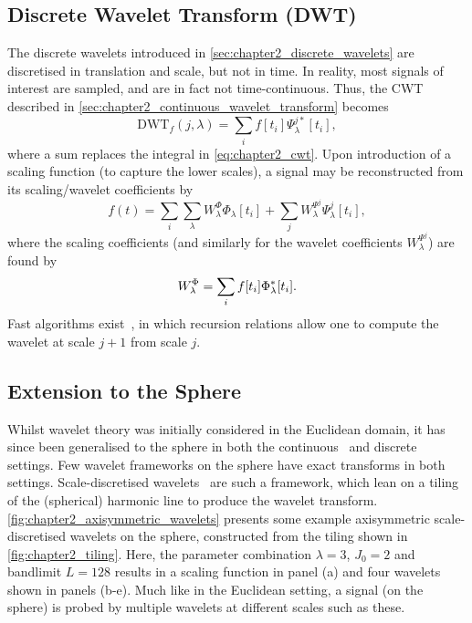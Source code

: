 \subsection{Discrete Wavelet Transform (DWT)}

The discrete wavelets introduced in \cref{sec:chapter2_discrete_wavelets} are discretised in translation and scale, but not in time.
In reality, most signals of interest are sampled, and are in fact not time-continuous.
Thus, the CWT described in \cref{sec:chapter2_continuous_wavelet_transform} becomes
%
\begin{equation}
	\text{DWT}_{f}(j,\lambda)
	= \sum\limits_{i} f[t_{i}] \Psi^{j\ast}_{\lambda}[t_{i}],
\end{equation}
%
where a sum replaces the integral in \cref{eq:chapter2_cwt}.
Upon introduction of a scaling function (to capture the lower scales), a signal may be reconstructed from its scaling/wavelet coefficients by
%
\begin{equation}
	f(t)
	= \sum\limits_{i} \sum\limits_{\lambda} W^{\Phi}_{\lambda} \Phi_{\lambda}[t_{i}]
	+ \sum\limits_{j} W^{\Psi^{j}}_{\lambda} \Psi^{j}_{\lambda}[t_{i}],
\end{equation}
%
where the scaling coefficients (and similarly for the wavelet coefficients \(W^{\Psi^{j}}_{\lambda}\)) are found by
%
\begin{equation}
	W^{\Phi}_{\lambda}
	= \sum\limits_{i} f[t_{i}] \Phi^{\ast}_{\lambda}[t_{i}].
\end{equation}
%
Fast algorithms exist~\cite{Beylkin1991,Rioul1992}, in which recursion relations allow one to compute the wavelet at scale \(j+1\) from scale \(j\).

\subsection{Extension to the Sphere}\label{sec:chapter2_extension_sphere}

Whilst wavelet theory was initially considered in the Euclidean domain, it has since been generalised to the sphere in both the continuous~\cite{Torresani1995,Holschneider1996,Freeden1997,Antoine1998,Antoine1999,Antoine2002,Demanet2003,Wiaux2005,Sanz2006,McEwen2006} and discrete~\cite{Sweldens1996,Schroder2000,Wiaux2005,Starck2006,Wiaux2008,Starck2009,Leistedt2013,McEwen2019,McEwen2018} settings.
Few wavelet frameworks on the sphere have exact transforms in both settings.
Scale-discretised wavelets~\cite{Wiaux2008,McEwen2018,Leistedt2013,McEwen2013,McEwen2015} are such a framework, which lean on a tiling of the (spherical) harmonic line to produce the wavelet transform.
\cref{fig:chapter2_axisymmetric_wavelets} presents some example axisymmetric scale-discretised wavelets on the sphere, constructed from the tiling shown in \cref{fig:chapter2_tiling}.
Here, the parameter combination \(\lambda=3\), \(J_{0}=2\) and bandlimit \(L=128\) results in a scaling function in panel (a) and four wavelets shown in panels (b-e).
Much like in the Euclidean setting, a signal (on the sphere) is probed by multiple wavelets at different scales such as these.

